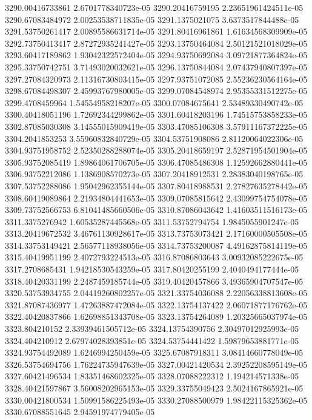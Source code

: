 {3290.00416733861 2.6701778340723e-05
3290.20416759195 2.23651961424511e-05
3290.67083484972 2.00253538711835e-05
3291.1375021075 3.6373517844488e-05
3291.53750261417 2.00895586631714e-05
3291.80416961861 1.61634568309909e-05
3292.73750413417 2.87272935241427e-05
3293.13750464084 2.50121521018029e-05
3293.60417189862 1.93042322572404e-05
3294.93750692084 3.09721877364824e-05
3295.33750742751 3.71493020032621e-05
3296.13750844084 2.07437940807397e-05
3297.27084320973 2.11316730803415e-05
3297.93751072085 2.55236230564164e-05
3298.67084498307 2.45993767980005e-05
3299.07084548974 2.95355331512275e-05
3299.4708459964 1.54554958218207e-05
3300.07084675641 2.53489330490742e-05
3300.40418051196 1.72692344299862e-05
3301.60418203196 1.74515753858233e-05
3302.87085030308 3.14555015909419e-05
3303.47085106308 3.57911167372225e-05
3304.2041853253 3.55960832840729e-05
3304.53751908086 2.81120064022306e-05
3304.93751958752 2.52350288288074e-05
3305.20418659197 2.52871954501904e-05
3305.93752085419 1.89864061706705e-05
3306.47085486308 1.12592662880441e-05
3306.93752212086 1.1386908570273e-05
3307.20418912531 2.28383040198765e-05
3307.53752288086 1.95042962355144e-05
3307.80418988531 2.27827635278442e-05
3308.60419089864 2.21934804441653e-05
3309.07085815642 2.43099754754078e-05
3309.73752566753 6.81041485660506e-05
3310.87086043642 1.41603511516173e-05
3311.3375276942 1.60535287445568e-05
3311.53752794754 1.9845055901247e-05
3313.20419672532 3.46761130928617e-05
3313.73753073421 2.17160000505508e-05
3314.33753149421 2.56577118938056e-05
3314.73753200087 4.49162875814119e-05
3315.40419951199 2.4072793224513e-05
3316.87086803643 3.00932085222675e-05
3317.2708685431 1.94218530543259e-05
3317.80420255199 2.4040494177444e-05
3318.40420331199 2.2487459185744e-05
3319.40420457866 3.49365904707547e-05
3320.53753934755 2.04419260802257e-05
3321.33754036088 2.22056338813608e-05
3321.87087436977 1.47263887472084e-05
3322.13754137422 2.06071877176762e-05
3322.40420837866 1.62698851343708e-05
3323.13754264089 1.20325665037974e-05
3323.804210152 2.33939461505712e-05
3324.13754390756 2.30497012925993e-05
3324.404210912 2.67974028393851e-05
3324.53754441422 1.59879653881771e-05
3324.93754492089 1.6246994250459e-05
3325.67087918311 3.08414660778049e-05
3326.53754694756 1.76224735947639e-05
3327.00421420534 2.39252208595149e-05
3327.60421496534 1.83351468602325e-05
3328.07088222312 1.194214571338e-05
3328.40421597867 3.56008202965153e-05
3329.33755049423 2.5024167865921e-05
3330.00421800534 1.50991586225493e-05
3330.27088500979 1.98422115325362e-05
3330.67088551645 2.94591974779405e-05
}
